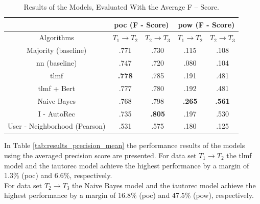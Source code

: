 \begin{table}[h!]
    \centering
    \begin{tabular}{|c|c|c|c|c|}
    \hline
     & \multicolumn{2}{|c|}{\acrshort{poc} (F - Score)} & \multicolumn{2}{|c|}{\acrshort{pow} (F - Score)} \\
     \hline
    Algorithms & $T_1 \to T_2$ & $T_2 \to T_3$ & $T_1 \to T_2$ & $T_2 \to T_3$\\
    \hline  Majority (baseline) & .771 & .730 & .115 & .108 \\ 
    \acrshort{nn} (baseline) & .747 & .720 & .080 & .104\\
    \acrshort{tlmf} & \textbf{.778} & .785 & .191 & .481\\
    \acrshort{tlmf} + Bert & .777 & .780  & .192 & .481 \\
    Naive Bayes & .768 & .798 & \textbf{.265} & \textbf{.561} \\
    I - AutoRec & .735 & \textbf{.805} & .197 & .530\\
    User - Neighborhood (Pearson) & .531 & .575 & .180 & .125\\
    \hline
    \end{tabular}
    \caption{Results of the Models, Evaluated With the Average F – Score.}
    \label{tab:results_f1_mean}
\end{table}
\noindent In Table \ref{tab:results_precision_mean} the performance results of the models using the averaged precision score are presented. For data set $T_1 \to T_2$ the \acrshort{tlmf} model and the \acrshort{iautorec} model achieve the highest performance by a margin of 1.3\% (\acrshort{poc}) and 6.6\%, respectively.\\
For data set $T_2 \to T_3$ the Naive Bayes model and the \acrshort{iautorec} model achieve the highest performance by a margin of 16.8\% (\acrshort{poc}) and 47.5\% (\acrshort{pow}), respectively.
